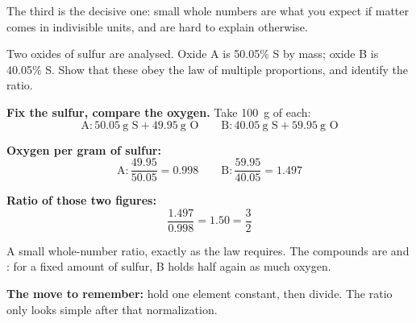 \documentclass{apchem-worksheet}
\begin{document}
The third is the decisive one: small whole numbers are what you expect if
matter comes in indivisible units, and are hard to explain otherwise.

\begin{workedexample}
Two oxides of sulfur are analysed. Oxide A is 50.05\% S by mass; oxide B
is 40.05\% S. Show that these obey the law of multiple proportions, and
identify the ratio.

\textbf{Fix the sulfur, compare the oxygen.} Take \SI{100}{\gram} of
each:
\[ \text{A}: 50.05~\text{g S} + 49.95~\text{g O} \qquad
   \text{B}: 40.05~\text{g S} + 59.95~\text{g O} \]

\textbf{Oxygen per gram of sulfur:}
\[ \text{A}: \frac{49.95}{50.05} = 0.998 \qquad
   \text{B}: \frac{59.95}{40.05} = 1.497 \]

\textbf{Ratio of those two figures:}
\[ \frac{1.497}{0.998} = 1.50 = \frac{3}{2} \]

A small whole-number ratio, exactly as the law requires. The compounds
are  and : for a fixed amount of sulfur, B holds half
again as much oxygen.

\textbf{The move to remember:} hold one element constant, then divide.
The ratio only looks simple after that normalization.
\end{workedexample}
\end{document}

